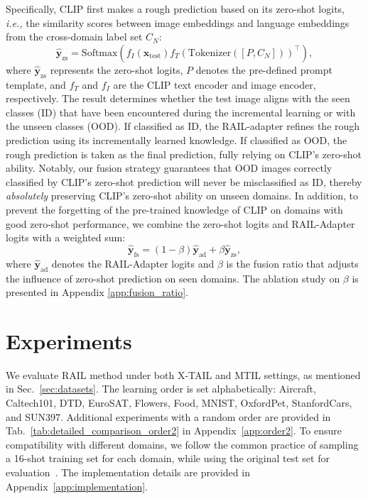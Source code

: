 \documentclass{article}
\begin{document}
Specifically, CLIP first makes a rough prediction based on its zero-shot logits, \textit{i.e.,} the similarity scores between image embeddings and language embeddings from the cross-domain label set $C_N$:
\begin{equation}
\label{zs_prediction}
\hat{\mathbf{y}}_\text{zs}=\text{Softmax}\left(f_I\left(\mathbf{x}_{\text{test}}\right) f_T\left(\text{Tokenizer}\left([P, C_N]\right)\right)^\top\right),
\end{equation}
where $\hat{\mathbf{y}}_\text{zs}$ represents the zero-shot logits, $P$ denotes the pre-defined prompt template, and $f_T$ and $f_I$ are the CLIP text encoder and image encoder, respectively. The result determines whether the test image aligns with the seen classes (ID) that have been encountered during the incremental learning or with the unseen classes (OOD). If classified as ID, the RAIL-adapter refines the rough prediction using its incrementally learned knowledge. If classified as OOD, the rough prediction is taken as the final prediction, fully relying on CLIP's zero-shot ability. Notably, our fusion strategy guarantees that OOD images correctly classified by CLIP's zero-shot prediction will never be misclassified as ID, thereby \textit{absolutely} preserving CLIP's zero-shot ability on unseen domains.
In addition, to prevent the forgetting of the pre-trained knowledge of CLIP on domains with good zero-shot performance, we combine the zero-shot logits and RAIL-Adapter logits with a weighted sum:
\begin{equation}
\label{fs_prediction}
    \hat{\mathbf{y}}_\text{fs} = \left(1-\beta\right)\hat{\mathbf{y}}_\text{ad} + \beta \hat{\mathbf{y}}_\text{zs},
\end{equation}
where $\hat{\mathbf{y}}_\text{ad}$ denotes the RAIL-Adapter logits and $\beta$ is the fusion ratio that adjusts the influence of zero-shot prediction on seen domains. The ablation study on $\beta$ is presented in Appendix \ref{app:fusion_ratio}.

\section{Experiments}
\label{sec:experiments}
We evaluate RAIL method under both X-TAIL and MTIL settings, as mentioned in Sec.~\ref{sec:datasets}. The learning order is set alphabetically: Aircraft, Caltech101, DTD, EuroSAT, Flowers, Food, MNIST, OxfordPet, StanfordCars, and SUN397. Additional experiments with a random order are provided in Tab.~\ref{tab:detailed_comparison_order2} in Appendix~\ref{app:order2}. To ensure compatibility with different domains, we follow the common practice of sampling a 16-shot training set for each domain, while using the original test set for evaluation~\cite{gao2024clip,zhang2021tip,zhou2022conditional,Zhou_2022,khattak2023maple}. The implementation details are provided in Appendix~\ref{app:implementation}.
\end{document}
